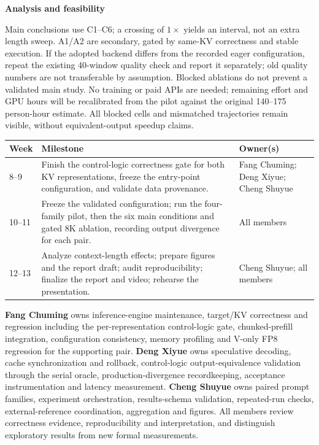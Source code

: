 \documentclass[11pt,a4paper]{article}
\makeatletter
\renewcommand\section{\@startsection{section}{1}{0pt}{-0.9em}{0.2em}{\normalfont\large\bfseries\color{PolyUBlue}}}
\makeatother
\begin{document}
\textbf{Analysis and feasibility}\par
\nopagebreak[4]Main conclusions use C1--C6; a crossing of $1\times$ yields an interval, not an extra length sweep. A1/A2 are secondary, gated by same-KV correctness and stable execution. If the adopted backend differs from the recorded eager configuration, repeat the existing 40-window quality check and report it separately; old quality numbers are not transferable by assumption. Blocked ablations do not prevent a validated main study. No training or paid APIs are needed; remaining effort and GPU hours will be recalibrated from the pilot against the original 140--175 person-hour estimate. All blocked cells and mismatched trajectories remain visible, without equivalent-output speedup claims.

\section{Timeline and Roles}
\begin{tabularx}{\linewidth}{@{}p{1.3cm} X >{\raggedright\arraybackslash}p{3.0cm}@{}}
\toprule
\textbf{Week} & \textbf{Milestone} & \textbf{Owner(s)} \\
\midrule
8--9 & Finish the control-logic correctness gate for both KV representations, freeze the entry-point configuration, and validate data provenance. & Fang Chuming; Deng Xiyue; Cheng Shuyue \\
10--11 & Freeze the validated configuration; run the four-family pilot, then the six main conditions and gated 8K ablation, recording output divergence for each pair. & All members \\
12--13 & Analyze context-length effects; prepare figures and the report draft; audit reproducibility; finalize the report and video; rehearse the presentation. & Cheng Shuyue; all members \\
\bottomrule
\end{tabularx}

\textbf{Fang Chuming} owns inference-engine maintenance, target/KV correctness and regression including the per-representation control-logic gate, chunked-prefill integration, configuration consistency, memory profiling and V-only FP8 regression for the supporting pair. \textbf{Deng Xiyue} owns speculative decoding, cache synchronization and rollback, control-logic output-equivalence validation through the serial oracle, production-divergence recordkeeping, acceptance instrumentation and latency measurement. \textbf{Cheng Shuyue} owns paired prompt families, experiment orchestration, results-schema validation, repeated-run checks, external-reference coordination, aggregation and figures. All members review correctness evidence, reproducibility and interpretation, and distinguish exploratory results from new formal measurements.
\end{document}

